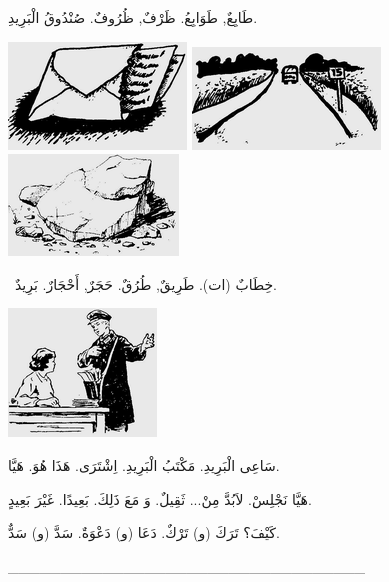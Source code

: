 \documentclass[a5paper]{article}
\begin{document}
طَابِعٌ, طَوَابِعُ. ظَرْفٌ, ظُرُوفٌ. صُنْدُوقُ الْبَرِيدِ.

 \includegraphics[width=1.8646in,height=1.1252in]{images/MuhammadBagauddinprettified-img152.png}   \includegraphics[width=1.9689in,height=1.0728in]{images/MuhammadBagauddinprettified-img153.png}   \includegraphics[width=1.7811in,height=1.0626in]{images/MuhammadBagauddinprettified-img154.png} 

\ خِطَابٌ (ات). طَرِيقٌ, طُرُقٌ. حَجَرٌ, أَحْجَارٌ. بَرِيدٌ.

 \includegraphics[width=1.552in,height=1.3437in]{images/MuhammadBagauddinprettified-img155.png} 

سَاعِى الْبَرِيدِ. مَكْتَبُ الْبَرِيدِ. اِشْتَرَى. هَذَا هُوَ. هَيَّا.

هَيَّا نَجْلِسْ. لاَبُدَّ مِنْ... ثَقِيلٌ. وَ مَعَ ذَلِكَ. بَعِيدًا. غَيْرَ بَعِيدٍ.

كَيْفَ؟ تَرَكَ (و) تَرْكٌ. دَعَا (و) دَعْوَةٌ. سَدَّ (و) سَدٌّ.

\_\_\_\_\_\_\_\_\_\_\_\_\_\_\_\_\_\_\_\_\_\_\_\_\_\_\_\_\_\_\_\_\_\_
\end{document}
